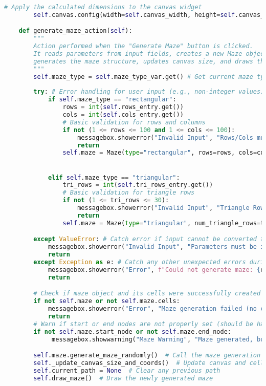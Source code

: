 \documentclass[UTF8]{report}
\theoremstyle{MyLineTheoremStyle} %
\theoremstyle{MyBlockTheoremStyle} %
\theoremstyle{MySubsubsectionStyle} %
\begin{document}
\begin{lstlisting}[language=Python, caption={迷宫生成与求解程序代码}]
        # Apply the calculated dimensions to the canvas widget
        self.canvas.config(width=self.canvas_width, height=self.canvas_height)

    def generate_maze_action(self):
        """
        Action performed when the "Generate Maze" button is clicked.
        It reads parameters from input fields, creates a new Maze object,
        generates the maze structure, updates canvas size, and draws the maze.
        """
        self.maze_type = self.maze_type_var.get() # Get current maze type
        
        try: # Error handling for user input (e.g., non-integer values)
            if self.maze_type == "rectangular":
                rows = int(self.rows_entry.get())
                cols = int(self.cols_entry.get())
                # Basic validation for rows and columns
                if not (1 <= rows <= 100 and 1 <= cols <= 100):
                    messagebox.showerror("Invalid Input", "Rows/Cols must be between 1 and 100.")
                    return
                self.maze = Maze(type="rectangular", rows=rows, cols=cols)


            elif self.maze_type == "triangular":
                tri_rows = int(self.tri_rows_entry.get())
                # Basic validation for triangle rows
                if not (1 <= tri_rows <= 30): 
                    messagebox.showerror("Invalid Input", "Triangle Rows must be between 1 and 30.")
                    return
                self.maze = Maze(type="triangular", num_triangle_rows=tri_rows)

        except ValueError: # Catch error if input cannot be converted to int
            messagebox.showerror("Invalid Input", "Parameters must be integers.")
            return
        except Exception as e: # Catch any other unexpected errors during maze creation
            messagebox.showerror("Error", f"Could not generate maze: {e}")
            return

        # Check if maze object and its cells were successfully created
        if not self.maze or not self.maze.cells: 
            messagebox.showerror("Error", "Maze generation failed (no cells were created).")
            return
        # Warn if start or end nodes are not properly set (should be handled by Maze init)
        if not self.maze.start_node or not self.maze.end_node:
             messagebox.showwarning("Maze Warning", "Maze generated, but start or end node is invalid. Pathfinding may fail.")

        self.maze.generate_maze_randomly()  # Call the maze generation algorithm
        self._update_canvas_size_and_coords()  # Update canvas and cell coordinates for drawing
        self.current_path = None  # Clear any previous path
        self.draw_maze()  # Draw the newly generated maze
        

\end{lstlisting}
\end{document}
